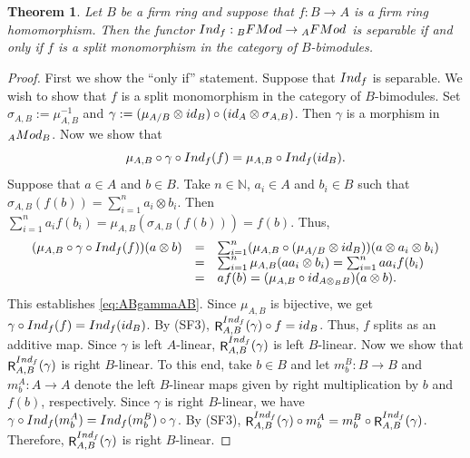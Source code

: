\documentclass[10pt,a4paper]{amsart}
\newtheorem{thm}{Theorem}
\newcommand{\FMod}{{\rm FMod}}
\newcommand{\Ind}{{\rm Ind}}
\newcommand{\Mod}{{\rm Mod}}
\newcommand{\N}{\mathbb{N}}
\DeclareMathOperator{\R}{\mathsf R}
\newcommand{\id}{{\rm id}}
\begin{document}
\begin{thm}
Let $B$ be a firm ring and suppose that 
$f : B \to A$ is a firm 
ring homomorphism. Then the functor
$\Ind_f : {}_B \FMod \to {}_A \FMod$ is 
separable if and only if 
$f$ is a split monomorphism in the category 
of $B$-bimodules. 
\end{thm}

\begin{proof}
First we show the ``only if'' statement.
Suppose that $\Ind_f$ is separable.
We wish to show that $f$ is a split monomorphism
in the category of $B$-bimodules.
Set $\sigma_{A,B} := \mu_{A,B}^{-1}$ 
and $\gamma := (\mu_{A/B} \otimes \id_B) \circ 
(\id_A \otimes \sigma_{A,B})$. 
Then $\gamma$ is 
a morphism in ${}_A \Mod_B$. 
Now we show that
\begin{equation}\label{eq:ABgammaAB}
\mu_{A,B} \circ \gamma \circ 
\Ind_f(f) = 
\mu_{A,B} \circ 
\Ind_f(\id_B). 
\end{equation}
Suppose that 
$a \in A$ and $b \in B$.
Take $n \in \N$, $a_i \in A$ and $b_i \in B$
such that $\sigma_{A,B}( f(b) ) = 
\sum_{i=1}^n a_i \otimes b_i$.
Then $\sum_{i=1}^n a_i f(b_i) = 
\mu_{A,B}(\sigma_{A,B}(f(b))) = f(b)$.
Thus,
\[
\begin{array}{rcl}
(\mu_{A,B} \circ \gamma \circ \Ind_f(f))
(a \otimes b) 
&=& 
\sum_{i=1}^n 
(\mu_{A,B} \circ (\mu_{A/B} \otimes \id_B))
(a \otimes a_i \otimes b_i) \\ 
&=&
\sum_{i=1}^n \mu_{A,B}( a a_i \otimes b_i ) 
= \sum_{i=1}^n a a_i f(b_i) \\
&=& 
a f(b) = 
(\mu_{A,B} \circ \id_{A \otimes_B B})(a \otimes b).
\end{array}
\]
This establishes \eqref{eq:ABgammaAB}.
Since $\mu_{A,B}$ is bijective, we get 
$\gamma \circ \Ind_f(f) = 
\Ind_f(\id_B)$.
By (SF3), 
$\R_{A,B}^{\Ind_f}(\gamma) \circ f = \id_B$.
Thus, $f$ splits as an additive map.
Since $\gamma$ is left $A$-linear,
$\R_{A,B}^{\Ind_f}(\gamma)$ is 
left $B$-linear. Now we show that 
$\R_{A,B}^{\Ind_f}(\gamma)$
is right $B$-linear.
To this end, take $b \in B$ and let
$m_b^B : B \to B$ and $m_b^A : A \to A$
denote the left $B$-linear maps given by right multiplication by $b$ and $f(b)$, respectively.
Since $\gamma$ is right $B$-linear, we have
$\gamma \circ \Ind_f(m_b^A)=\Ind_f(m_b^B)\circ \gamma$.
By (SF3), $\R_{A,B}^{\Ind_f}(\gamma)\circ m_b^A
= m_b^B\circ \R_{A,B}^{\Ind_f}(\gamma)$.
Therefore, $\R_{A,B}^{\Ind_f}(\gamma)$ is right $B$-linear.


\end{proof}
\end{document}
